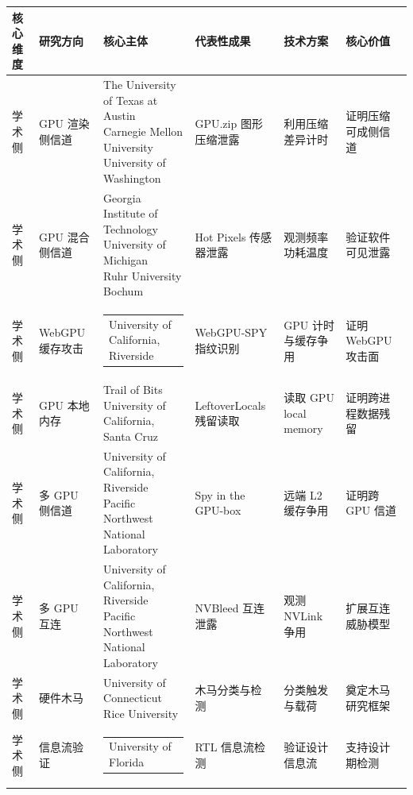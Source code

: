 \newcommand{\cellsubj}[1]{\begin{tabular}[t]{@{}l@{}}#1\end{tabular}}

\begin{table}[htbp]
\centering
\scriptsize
\renewcommand{\arraystretch}{1.22}
\begin{tabularx}{\textwidth}{|p{0.78cm}|p{1.05cm}|p{2.45cm}|Y|Y|Y|}
\hline
核心维度 & 研究方向 & 核心主体 & 代表性成果 & 技术方案 & 核心价值 \\
\hline
学术侧 & GPU 渲染侧信道 & \cellsubj{The University of Texas at Austin\\Carnegie Mellon University\\University of Washington} & GPU.zip 图形压缩泄露 \cite{gpuzip2024} & 利用压缩差异计时 & 证明压缩可成侧信道 \\
\hline
学术侧 & GPU 混合侧信道 & \cellsubj{Georgia Institute of Technology\\University of Michigan\\Ruhr University Bochum} & Hot Pixels 传感器泄露 \cite{hotpixels2023} & 观测频率功耗温度 & 验证软件可见泄露 \\
\hline
学术侧 & WebGPU 缓存攻击 & \cellsubj{University of California, Riverside} & WebGPU-SPY 指纹识别 \cite{webgpuispy2024} & GPU 计时与缓存争用 & 证明 WebGPU 攻击面 \\
\hline
学术侧 & GPU 本地内存 & \cellsubj{Trail of Bits\\University of California, Santa Cruz} & LeftoverLocals 残留读取 \cite{leftoverlocals2024} & 读取 GPU local memory & 证明跨进程数据残留 \\
\hline
学术侧 & 多 GPU 侧信道 & \cellsubj{University of California, Riverside\\Pacific Northwest National Laboratory} & Spy in the GPU-box \cite{spygpubox2022} & 远端 L2 缓存争用 & 证明跨 GPU 信道 \\
\hline
学术侧 & 多 GPU 互连 & \cellsubj{University of California, Riverside\\Pacific Northwest National Laboratory} & NVBleed 互连泄露 \cite{nvbleed2025} & 观测 NVLink 争用 & 扩展互连威胁模型 \\
\hline
学术侧 & 硬件木马 & \cellsubj{University of Connecticut\\Rice University} & 木马分类与检测 \cite{tehranipoor2010trojan} & 分类触发与载荷 & 奠定木马研究框架 \\
\hline
学术侧 & 信息流验证 & \cellsubj{University of Florida} & RTL 信息流检测 \cite{nahiyan2018ifs} & 验证设计信息流 & 支持设计期检测 \\

\end{tabularx}
\end{table}
